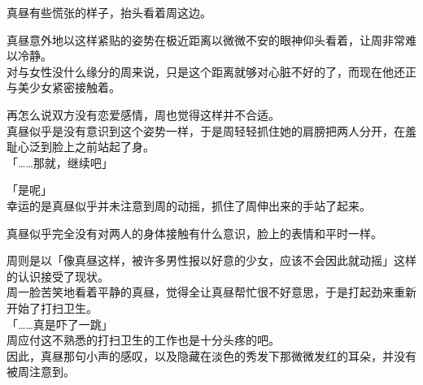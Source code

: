 真昼有些慌张的样子，抬头看着周这边。

真昼意外地以这样紧贴的姿势在极近距离以微微不安的眼神仰头看着，让周非常难以冷静。\\

对与女性没什么缘分的周来说，只是这个距离就够对心脏不好的了，而现在他还正与美少女紧密接触着。

再怎么说双方没有恋爱感情，周也觉得这样并不合适。\\

真昼似乎是没有意识到这个姿势一样，于是周轻轻抓住她的肩膀把两人分开，在羞耻心泛到脸上之前站起了身。\\

「……那就，继续吧」

「是呢」\\

幸运的是真昼似乎并未注意到周的动摇，抓住了周伸出来的手站了起来。

真昼似乎完全没有对两人的身体接触有什么意识，脸上的表情和平时一样。

周则是以「像真昼这样，被许多男性报以好意的少女，应该不会因此就动摇」这样的认识接受了现状。\\

周一脸苦笑地看着平静的真昼，觉得全让真昼帮忙很不好意思，于是打起劲来重新开始了打扫卫生。\\

「……真是吓了一跳」\\

周应付这不熟悉的打扫卫生的工作也是十分头疼的吧。\\

因此，真昼那句小声的感叹，以及隐藏在淡色的秀发下那微微发红的耳朵，并没有被周注意到。
